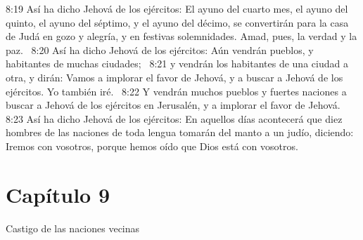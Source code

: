 8:19 Así ha dicho Jehová de los ejércitos: El ayuno del cuarto mes, el ayuno del quinto, el ayuno del séptimo, y el ayuno del décimo, se convertirán para la casa de Judá en gozo y alegría, y en festivas solemnidades. Amad, pues, la verdad y la paz.  
8:20 Así ha dicho Jehová de los ejércitos: Aún vendrán pueblos, y habitantes de muchas ciudades;  
8:21 y vendrán los habitantes de una ciudad a otra, y dirán: Vamos a implorar el favor de Jehová, y a buscar a Jehová de los ejércitos. Yo también iré.  
8:22 Y vendrán muchos pueblos y fuertes naciones a buscar a Jehová de los ejércitos en Jerusalén, y a implorar el favor de Jehová.  
8:23 Así ha dicho Jehová de los ejércitos: En aquellos días acontecerá que diez hombres de las naciones de toda lengua tomarán del manto a un judío, diciendo: Iremos con vosotros, porque hemos oído que Dios está con vosotros.  
\section*{Capítulo 9 }
Castigo de las naciones vecinas  

